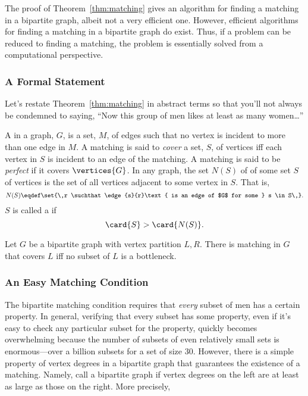 The proof of Theorem~\ref{thm:matching} gives an algorithm for finding
a matching in a bipartite graph, albeit not a very efficient one.
However, efficient algorithms for finding a matching in a bipartite
graph do exist.  Thus, if a problem can be reduced to finding a
matching, the problem is essentially solved from a computational
perspective.

\subsubsection{A Formal Statement}

Let's restate Theorem~\ref{thm:matching} in abstract terms so that
you'll not always be condemned to saying, ``Now this group of men
likes at least as many women\dots''

\begin{definition}\label{def:5K}
 A  in a graph, $G$, is a set, $M$, of
edges such that no vertex is incident to more than one edge in $M$.  A
matching is said to \emph{cover} a set, $S$, of vertices iff each
vertex in $S$ is incident to an edge of the matching.  A matching is
said to be \emph{perfect} if it covers $\vertices{G}$.  In any graph,
the set $N(S)$ of  of some set $S$ of vertices is
the set of all vertices adjacent to some vertex in $S$.  That is,
\[
N(S) \eqdef \set{\,r \suchthat \edge{s}{r}\text{ is an edge of $G$ for
    some } s \in S\,}.
\]
$S$ is called a  if
\[
\card{S} > \card{N(S)}.
\]
\end{definition}

\begin{theorem}\label{thm:halls}
  Let $G$ be a bipartite graph with vertex partition $L,R$.  There is matching in $G$
  that covers $L$ iff no subset of $L$ is a bottleneck.
\end{theorem}

\subsubsection{An Easy Matching Condition}

The bipartite matching condition requires that \emph{every} subset of
men has a certain property.  In general, verifying that every subset
has some property, even if it's easy to check any particular subset
for the property, quickly becomes overwhelming because the number of
subsets of even relatively small sets is enormous---over a billion
subsets for a set of size 30.  However, there is a simple property of
vertex degrees in a bipartite graph that guarantees the existence of a
matching.  Namely, call a bipartite graph 
if vertex degrees on the left are at least as large as those on the
right.  More precisely,

